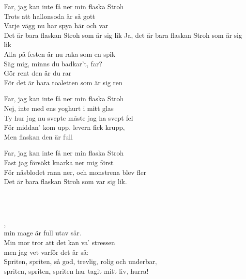 Far, jag kan inte få ner min flaska Stroh \\
Trots att hallonsoda är så gott\\
Varje vägg nu har spya här och var \\
Det är bara flaskan Stroh som är sig lik 
\newpage
Ja, det är bara flaskan Stroh som är sig lik \\
Alla på festen är nu raka som en spik \\
Säg mig, minns du badkar't, far? \\
Gör rent den är du rar \\
För det är bara toaletten som är sig ren 

Far, jag kan inte få ner min flaska Stroh \\
Nej, inte med ens yoghurt i mitt glas  \\
Ty hur jag nu svepte måste jag ha svept fel \\
För middan' kom upp, levern fick krupp, \\
Men flaskan den är full 

Far, jag kan inte få ner min flaska Stroh \\
Fast jag försökt knarka ner mig först \\
För näsblodet rann ner, och monstrena blev fler \\
Det är bara flaskan Stroh som var sig lik.

\\


 \\       
\author{Text: Janne Weijnitz}

,\\
min mage är full utav sår.\\
Min mor tror att det kan va' stressen\\
men jag vet varför det är så:\\
Spriten, spriten, så god, trevlig, rolig och underbar,\\
spriten, spriten, spriten har tagit mitt liv, hurra!

\newpage


 \\       

